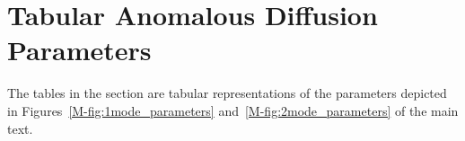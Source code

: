 \documentclass{article}
\begin{document}
  


 
  
  \newpage  
  
  \section{Tabular Anomalous Diffusion Parameters}\label{section:tabular_AD_params}
  
  The tables in the section are tabular representations of the parameters depicted
  in Figures~\ref{M-fig:1mode_parameters} and~\ref{M-fig:2mode_parameters} of the 
  main text.
  
\end{document}
